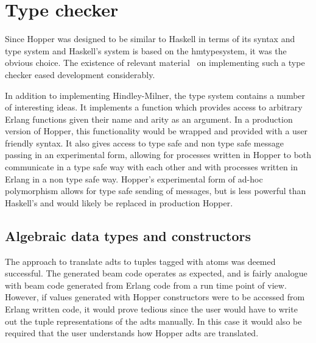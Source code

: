 \section{Type checker}

Since Hopper was designed to be similar to Haskell in terms of its syntax and type system and Haskell's system is based on the \Gls{hmtypesystem}, it was the obvious choice. The existence of relevant material~\cite{implfun} on implementing such a type checker eased development considerably. 

In addition to implementing Hindley-Milner, the type system contains a number of interesting ideas. It implements a function which provides access to arbitrary Erlang functions given their name and arity as an argument. In a production version of Hopper, this functionality would be wrapped and provided with a user friendly syntax. It also gives access to type safe and non type safe message passing in an experimental form, allowing for processes written in Hopper to both communicate in a type safe way with each other and with processes written in Erlang in a non type safe way. Hopper's experimental form of ad-hoc polymorphism allows for type safe sending of messages, but is less powerful than Haskell's and would likely be replaced in production Hopper.

\subsection{Algebraic data types and constructors}

The approach to translate \glspl{adt} to tuples tagged with atoms was deemed successful. The generated beam code operates as expected, and is fairly analogue with beam code generated from Erlang code from a run time point of view. However, if values generated with Hopper constructors were to be accessed from Erlang written code, it would prove tedious since the user would have to write out the tuple representations of the \glspl{adt} manually. In this case it would also be required that the user understands how Hopper \glspl{adt} are translated.